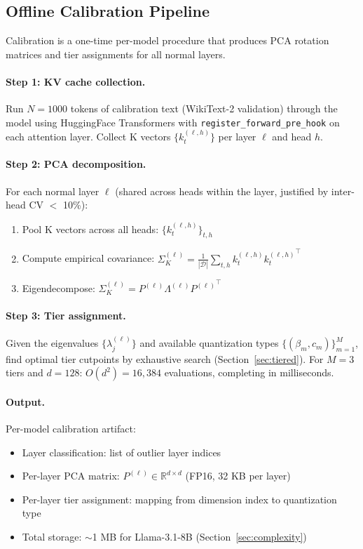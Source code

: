 \subsection{Offline Calibration Pipeline}
\label{sec:calibration}

Calibration is a one-time per-model procedure that produces PCA rotation matrices and tier assignments for all normal layers.

\paragraph{Step 1: KV cache collection.}
Run $N = 1000$ tokens of calibration text (WikiText-2 validation) through the model using HuggingFace Transformers with \texttt{register\_forward\_pre\_hook} on each attention layer. Collect K vectors $\{k_t^{(\ell,h)}\}$ per layer $\ell$ and head $h$.

\paragraph{Step 2: PCA decomposition.}
For each normal layer $\ell$ (shared across heads within the layer, justified by inter-head CV $<$ 10\%):
\begin{enumerate}
    \item Pool K vectors across all heads: $\{k_t^{(\ell,h)}\}_{t,h}$
    \item Compute empirical covariance: $\Sigma_K^{(\ell)} = \frac{1}{|\mathcal{D}|} \sum_{t,h} k_t^{(\ell,h)} {k_t^{(\ell,h)}}^\top$
    \item Eigendecompose: $\Sigma_K^{(\ell)} = P^{(\ell)} \Lambda^{(\ell)} {P^{(\ell)}}^\top$
\end{enumerate}

\paragraph{Step 3: Tier assignment.}
Given the eigenvalues $\{\lambda_j^{(\ell)}\}$ and available quantization types $\{(\beta_m, c_m)\}_{m=1}^M$, find optimal tier cutpoints by exhaustive search (Section~\ref{sec:tiered}). For $M = 3$ tiers and $d = 128$: $O(d^2) = 16{,}384$ evaluations, completing in milliseconds.

\paragraph{Output.}
Per-model calibration artifact:
\begin{itemize}
    \item Layer classification: list of outlier layer indices
    \item Per-layer PCA matrix: $P^{(\ell)} \in \mathbb{R}^{d \times d}$ (FP16, 32 KB per layer)
    \item Per-layer tier assignment: mapping from dimension index to quantization type
    \item Total storage: $\sim$1 MB for Llama-3.1-8B (Section~\ref{sec:complexity})
\end{itemize}

